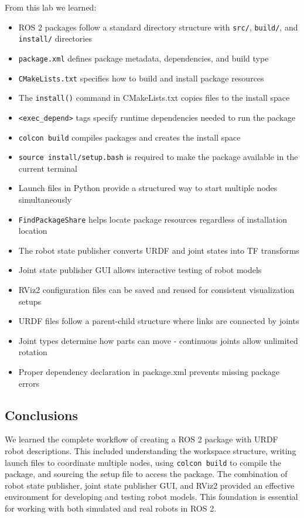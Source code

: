 From this lab we learned:
\begin{itemize}
	\item ROS 2 packages follow a standard directory structure with \texttt{src/}, \texttt{build/}, and \texttt{install/} directories
	\item \texttt{package.xml} defines package metadata, dependencies, and build type
	\item \texttt{CMakeLists.txt} specifies how to build and install package resources
	\item The \texttt{install()} command in CMakeLists.txt copies files to the install space
	\item \texttt{<exec\_depend>} tags specify runtime dependencies needed to run the package
	\item \texttt{colcon build} compiles packages and creates the install space
	\item \texttt{source install/setup.bash} is required to make the package available in the current terminal
	\item Launch files in Python provide a structured way to start multiple nodes simultaneously
	\item \texttt{FindPackageShare} helps locate package resources regardless of installation location
	\item The robot state publisher converts URDF and joint states into TF transforms
	\item Joint state publisher GUI allows interactive testing of robot models
	\item RViz2 configuration files can be saved and reused for consistent visualization setups
	\item URDF files follow a parent-child structure where links are connected by joints
	\item Joint types determine how parts can move - continuous joints allow unlimited rotation
	\item Proper dependency declaration in package.xml prevents missing package errors
\end{itemize}

\subsection{Conclusions}

We learned the complete workflow of creating a ROS 2 package with URDF robot descriptions. This included understanding the workspace structure, writing launch files to coordinate multiple nodes, using \texttt{colcon build} to compile the package, and sourcing the setup file to access the package. The combination of robot state publisher, joint state publisher GUI, and RViz2 provided an effective environment for developing and testing robot models. This foundation is essential for working with both simulated and real robots in ROS 2.

\clearpage